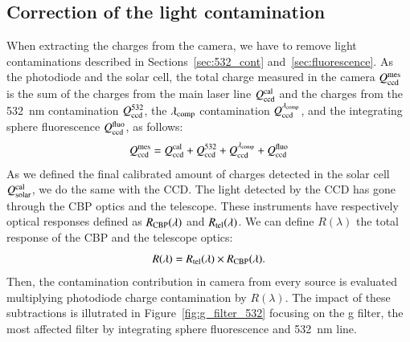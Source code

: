 %
%
%
%
%

\subsection{Correction of the light contamination}\label{sec:sd_contaminations}

When extracting the charges from the \SD camera, we have to remove light contaminations described in Sections~\ref{sec:532_cont} and~\ref{sec:fluorescence}. As the photodiode and the solar cell, the total charge measured in the \SD camera $Q_{\mathrm{ccd}}^{\mathrm{mes}}$ is the sum of the charges from the main laser line $Q_{\mathrm{ccd}}^{\mathrm{cal}}$ and the charges from the \SI{532}{\nm} contamination $Q_{\mathrm{ccd}}^{532}$, the $\lambda_{\rm comp}$ contamination $Q_{\mathrm{ccd}}^{\lambda_{\rm comp}}$, and the integrating sphere fluorescence $Q_{\mathrm{ccd}}^{\mathrm{fluo}}$, as follows:
\begin{equation}
    Q_{\mathrm{ccd}}^{\mathrm{mes}} = Q_{\mathrm{ccd}}^{\mathrm{cal}} + Q_{\mathrm{ccd}}^{532} + Q_{\mathrm{ccd}}^{\lambda_{\rm comp}} + Q_{\mathrm{ccd}}^{\mathrm{fluo}}
    \label{eq:qccd_mes}
\end{equation}
As we defined the final calibrated amount of charges detected in the solar cell $Q_{\mathrm{solar}}^{\mathrm{cal}}$, we do the same with the \SD CCD. The light detected by the \SD CCD has gone through the CBP optics and the \SD telescope. These instruments have respectively optical responses defined as $R_{\mathrm{CBP}}(\lambda)$ and $R_{\mathrm{tel}}(\lambda)$. We can define $R(\lambda)$ the total response of the CBP and the \SD telescope optics:
\begin{equation}
    R(\lambda) = R_{\mathrm{tel}}(\lambda) \times R_{\mathrm{CBP}}(\lambda).
    \label{eq:rtot}
\end{equation}
Then, the contamination contribution in \SD camera from every source is evaluated multiplying photodiode charge contamination by $R(\lambda)$.
The impact of these subtractions is illutrated in Figure~\ref{fig:g_filter_532} focusing on the \SD g filter, the most affected filter by integrating sphere fluorescence and \SI{532}{\nano\meter} line.

